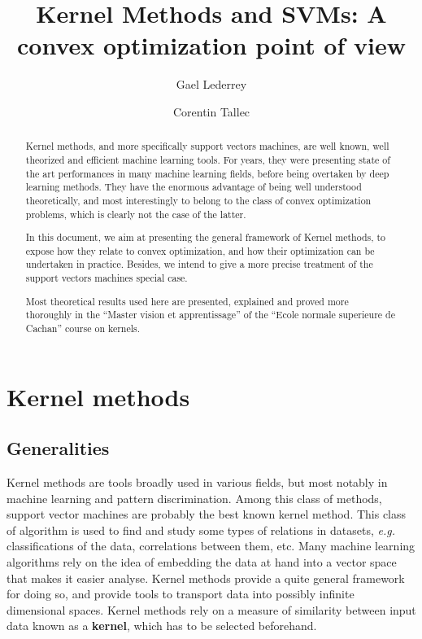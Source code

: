 \documentclass[a4paper, 11pt]{article}
\title{Kernel Methods and SVMs:
A convex optimization point of view}
\author{Gael Lederrey\\
  \and
Corentin Tallec}
\begin{document}
\maketitle
\begin{abstract}
  Kernel methods, and more specifically support vectors machines, are
  well known, well theorized and efficient machine learning tools. For
  years, they were presenting state of the art performances in many
  machine learning fields, before being overtaken by deep learning
  methods. They have the enormous advantage of being well understood
  theoretically, and most interestingly to belong to the class of
  convex optimization problems, which is clearly not the case of the
  latter.

  In this document, we aim at presenting the general framework of
  Kernel methods, to expose how they relate to convex optimization,
  and how their optimization can be undertaken in practice. Besides,
  we intend to give a more precise treatment of the support vectors
  machines special case.

  Most theoretical results used here are presented, explained and
  proved more thoroughly in the ``Master vision et apprentissage''
  of the ``Ecole normale superieure de Cachan'' course on kernels.
\end{abstract}

\section{Kernel methods}
\subsection{Generalities}
\label{sub:gen}

Kernel methods are tools broadly used in various fields, but most notably in
machine learning and pattern discrimination. Among this class of methods,
support vector machines are probably the best known kernel method. This class
of algorithm is used to find and study some types of relations in datasets,
{\it e.g.} classifications of the data, correlations between them, etc. Many
machine learning algorithms rely on the idea of embedding the data at hand
into a vector space that makes it easier analyse. Kernel methods provide
a quite general framework for doing so, and provide tools to transport data
into possibly infinite dimensional spaces. Kernel methods rely on a measure
of similarity between input data known as a {\bf kernel}, which has to be selected
beforehand.
\end{document}

